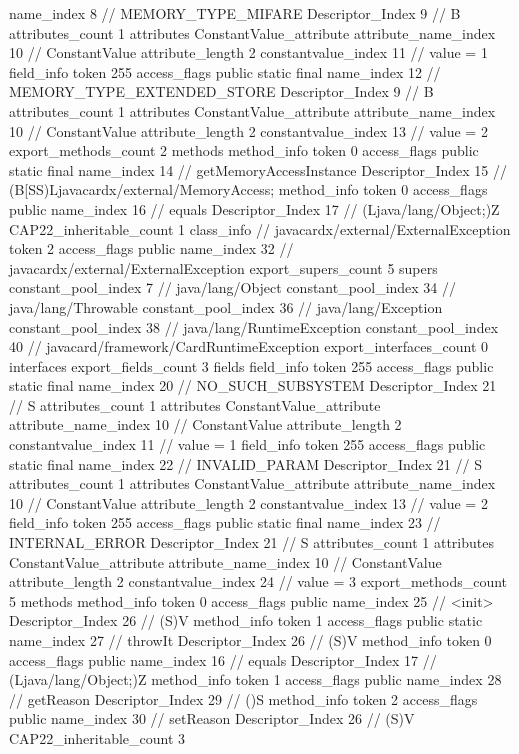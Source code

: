 {{{{{				name_index	8		// MEMORY_TYPE_MIFARE
				Descriptor_Index	9		// B
				attributes_count	1
				attributes {
				ConstantValue_attribute {
					attribute_name_index	10		// ConstantValue
					attribute_length	2
					constantvalue_index	11		// value = 1
				}
				}
			}
			field_info {
				token	255
				access_flags	public static final
				name_index	12		// MEMORY_TYPE_EXTENDED_STORE
				Descriptor_Index	9		// B
				attributes_count	1
				attributes {
				ConstantValue_attribute {
					attribute_name_index	10		// ConstantValue
					attribute_length	2
					constantvalue_index	13		// value = 2
				}
				}
			}
			}
			export_methods_count	2
			methods {
				method_info {
					token	0
					access_flags	public static final
					name_index	14		// getMemoryAccessInstance
					Descriptor_Index	15		// (B[SS)Ljavacardx/external/MemoryAccess;
				}
				method_info {
					token	0
					access_flags	public
					name_index	16		// equals
					Descriptor_Index	17		// (Ljava/lang/Object;)Z
				}
			}
			CAP22_inheritable_count	1
		}
		class_info {		// javacardx/external/ExternalException
			token	2
			access_flags	public
			name_index	32		// javacardx/external/ExternalException
			export_supers_count	5
			supers {
				constant_pool_index	7		// java/lang/Object
				constant_pool_index	34		// java/lang/Throwable
				constant_pool_index	36		// java/lang/Exception
				constant_pool_index	38		// java/lang/RuntimeException
				constant_pool_index	40		// javacard/framework/CardRuntimeException
			}
			export_interfaces_count	0
			interfaces {
			}
			export_fields_count	3
			fields {
			field_info {
				token	255
				access_flags	public static final
				name_index	20		// NO_SUCH_SUBSYSTEM
				Descriptor_Index	21		// S
				attributes_count	1
				attributes {
				ConstantValue_attribute {
					attribute_name_index	10		// ConstantValue
					attribute_length	2
					constantvalue_index	11		// value = 1
				}
				}
			}
			field_info {
				token	255
				access_flags	public static final
				name_index	22		// INVALID_PARAM
				Descriptor_Index	21		// S
				attributes_count	1
				attributes {
				ConstantValue_attribute {
					attribute_name_index	10		// ConstantValue
					attribute_length	2
					constantvalue_index	13		// value = 2
				}
				}
			}
			field_info {
				token	255
				access_flags	public static final
				name_index	23		// INTERNAL_ERROR
				Descriptor_Index	21		// S
				attributes_count	1
				attributes {
				ConstantValue_attribute {
					attribute_name_index	10		// ConstantValue
					attribute_length	2
					constantvalue_index	24		// value = 3
				}
				}
			}
			}
			export_methods_count	5
			methods {
				method_info {
					token	0
					access_flags	public
					name_index	25		// <init>
					Descriptor_Index	26		// (S)V
				}
				method_info {
					token	1
					access_flags	public static
					name_index	27		// throwIt
					Descriptor_Index	26		// (S)V
				}
				method_info {
					token	0
					access_flags	public
					name_index	16		// equals
					Descriptor_Index	17		// (Ljava/lang/Object;)Z
				}
				method_info {
					token	1
					access_flags	public
					name_index	28		// getReason
					Descriptor_Index	29		// ()S
				}
				method_info {
					token	2
					access_flags	public
					name_index	30		// setReason
					Descriptor_Index	26		// (S)V
				}
			}
			CAP22_inheritable_count	3
		}
	}
}
